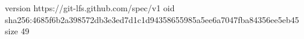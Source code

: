 version https://git-lfs.github.com/spec/v1
oid sha256:4685f6b2a398572db3e3ed7d1c1d94358655985a5ee6a7047fba84356ee5eb45
size 49
